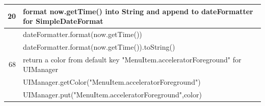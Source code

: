 \documentclass[sigconf,review,anonymous]{article}
\begin{document}
\begin{table}[]
\begin{tabular}{|l|l|}
\multicolumn{1}{|r|}{20}          & format now.getTime() into String and append to dateFormatter for SimpleDateFormat           \\ \hline
\rowcolor[HTML]{FFCCC9} 
                                  & dateFormatter.format(now.getTime())                                                         \\ \hline
\rowcolor[HTML]{FFCCC9} 
                                  & dateFormatter.format(now.getTime()).toString()                                              \\ \hline
\multicolumn{1}{|r|}{68}          & return a color from default key "MenuItem.acceleratorForeground" for UIManager              \\ \hline
\rowcolor[HTML]{FFCCC9} 
                                  & UIManager.getColor("MenuItem.acceleratorForeground")                                        \\ \hline
\rowcolor[HTML]{FFCCC9} 
                                  & UIManager.put("MenuItem.acceleratorForeground",color)                                       \\ \hline
\end{tabular}
\end{table}
\end{document}
